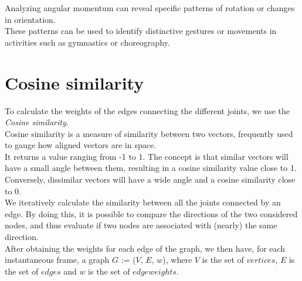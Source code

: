 Analyzing angular momentum can reveal specific patterns of rotation or changes in orientation. \\
These patterns can be used to identify distinctive gestures or movements in activities such as gymnastics or choreography.

\section{Cosine similarity}
To calculate the weights of the edges connecting the different joints, we use the \textit{Cosine similarity}. \\
Cosine similarity is a measure of similarity between two vectors, frequently used to gauge how aligned vectors are in space. \\
It returns a value ranging from -1 to 1.
The concept is that similar vectors will have a small angle between them, resulting in a cosine similarity value close to 1. \\
Conversely, dissimilar vectors will have a wide angle and a cosine similarity close to 0.\\
We iteratively calculate the similarity between all the joints connected by an edge.
By doing this, it is possible to compare the directions of the two considered nodes, and thus evaluate if two nodes are associated with
(nearly) the same direction.
\\

After obtaining the weights for each edge of the graph, we then have, for each instantaneous frame, a graph $G$ := ($V$, $E$, $w$), where 
$V$ is the set of $vertices$, $E$ is the set of $edges$ and $w$ is the set of $edge weights$.